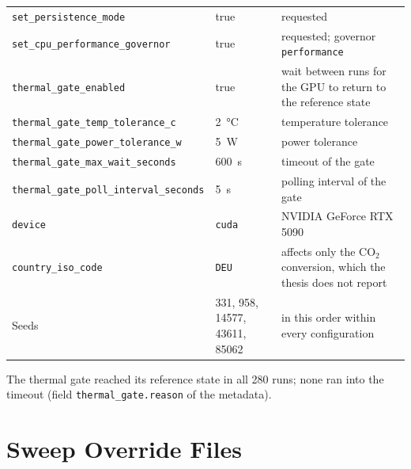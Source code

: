 \begin{table}[tbp]
\begin{tabular}{@{}p{4.7cm}p{3.7cm}p{5.0cm}@{}}
    \texttt{set\_persistence\_mode}                                      & true                           & requested                                                \\
    \texttt{set\_cpu\_performance\_governor}                             & true                           & requested; governor \texttt{performance}                \\
    \texttt{thermal\_gate\_enabled}                                      & true                           & wait between runs for the GPU to return to the reference state \\
    \texttt{thermal\_gate\_temp\_tolerance\_c}                           & \SI{2}{\celsius}               & temperature tolerance                                    \\
    \texttt{thermal\_gate\_power\_tolerance\_w}                          & \SI{5}{\watt}                  & power tolerance                                          \\
    \texttt{thermal\_gate\_max\_wait\_seconds}                           & \SI{600}{\second}              & timeout of the gate                                      \\
    \texttt{thermal\_gate\_poll\_interval\_seconds}                      & \SI{5}{\second}                & polling interval of the gate                             \\
    \texttt{device}                                                      & \texttt{cuda}                  & NVIDIA GeForce RTX 5090                                  \\
    \texttt{country\_iso\_code}                                          & \texttt{DEU}                   & affects only the CO$_2$ conversion, which the thesis does not report \\
    Seeds                                                                & \num{331}, \num{958}, \num{14577}, \num{43611}, \num{85062} & in this order within every configuration          \\
    \bottomrule
  \end{tabular}
\end{table}

The thermal gate reached its reference state in all \num{280} runs; none ran into the timeout (field \texttt{thermal\_gate.reason} of the metadata).

\section{Sweep Override Files}\label{sec:app-hp-sweeps}

